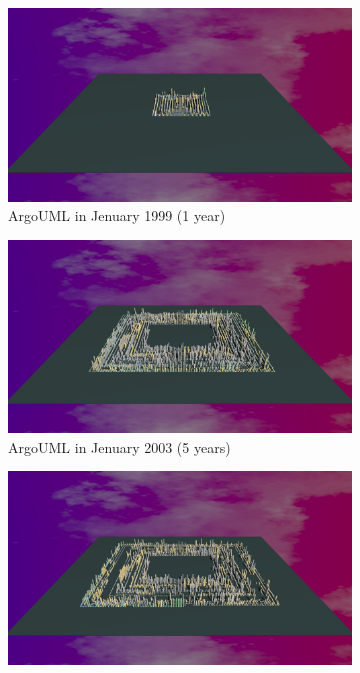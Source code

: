\begin{figure}[ht]
    \begin{subfigure}{0.48\textwidth}
        \includegraphics[width=\linewidth]{ArgoUML/Animation001.png}
        \caption{ArgoUML in Jenuary 1999 (1 year)} 
        \label{fig:ArgoUML_V3_S1}
    \end{subfigure}\hspace*{\fill}
    \begin{subfigure}{0.48\textwidth}
        \includegraphics[width=\linewidth]{ArgoUML/Animation005.png}
        \caption{ArgoUML in Jenuary 2003 (5 years)} 
        \label{fig:ArgoUML_V3_S2}
    \end{subfigure}
    \medskip
    \begin{subfigure}{0.48\textwidth}
        \includegraphics[width=\linewidth]{ArgoUML/Animation006.png}

\end{subfigure}
\end{figure}
